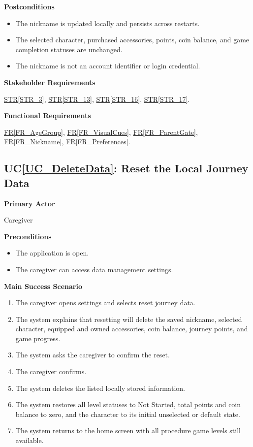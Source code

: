 \documentclass[10pt]{article}
\newcommand{\strref}[1]{\hyperref[#1]{STR\ref*{#1}}}
\newcounter{ucnum} %
\newcommand{\ucheading}[1]{UC\ref*{#1}}
\newcommand{\rref}[1]{\hyperref[#1]{FR\ref*{#1}}}
\begin{document}
\textbf{Postconditions}
\begin{itemize}
    \item The nickname is updated locally and persists across restarts.
    \item The selected character, purchased accessories, points,
    coin balance, and game completion statuses are unchanged.
    \item The nickname is not an account identifier or login credential.
\end{itemize}

\textbf{Stakeholder Requirements}

\strref{STR_3}, \strref{STR_13}, \strref{STR_16}, \strref{STR_17}.

\textbf{Functional Requirements}

\rref{FR_AgeGroup}, \rref{FR_VisualCues}, \rref{FR_ParentGate}, \rref{FR_Nickname}, \rref{FR_Preferences}.

\label{UC_DeleteData}
\subsection{\ucheading{UC_DeleteData}: Reset the Local Journey Data}

\textbf{Primary Actor}

Caregiver

\textbf{Preconditions}
\begin{itemize}
    \item The application is open.
    \item The caregiver can access data management settings.
\end{itemize}

\textbf{Main Success Scenario}
\begin{enumerate}
    \item The caregiver opens settings and selects reset journey data.
    \item The system explains that resetting will delete the saved
    nickname, selected character, equipped and owned accessories,
    coin balance, journey points, and game progress.
    \item The system asks the caregiver to confirm the reset.
    \item The caregiver confirms.
    \item The system deletes the listed locally stored information.
    \item The system restores all level statuses to Not Started,
    total points and coin balance to zero, and the character to
    its initial unselected or default state.
    \item The system returns to the home screen with all procedure game
    levels still available.
\end{enumerate}
\end{document}
